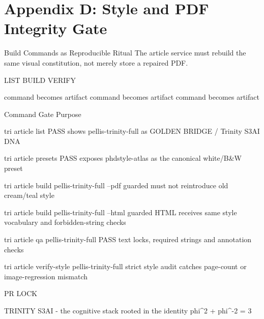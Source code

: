 
\section{Appendix D: Style and PDF Integrity Gate}

Build Commands as Reproducible Ritual
       The article service must rebuild the same visual constitution, not merely store a repaired
                                                 PDF.

                              LIST                                      BUILD                                      VERIFY

                    command becomes artifact                    command becomes artifact                   command becomes artifact

                         Command                                      Gate                                          Purpose

 tri article list                                           PASS                     shows pellis-trinity-full as GOLDEN BRIDGE / Trinity S3AI
                                                                                     DNA

 tri article presets                                        PASS                     exposes phdstyle-atlas as the canonical white/B\&W preset

 tri article build pellis-trinity-full --pdf                guarded                  must not reintroduce old cream/teal style

 tri article build pellis-trinity-full --html               guarded                  HTML receives same style vocabulary and forbidden-string checks

 tri article qa pellis-trinity-full                         PASS                     text locks, required strings and annotation checks

 tri article verify-style pellis-trinity-full               strict                   style audit catches page-count or image-regression mismatch

  PR LOCK

                                      TRINITY S3AI - the cognitive stack rooted in the identity phi^2 + phi^-2 = 3